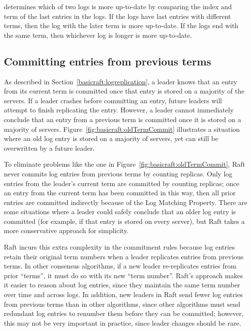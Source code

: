 \name{} determines which of two logs is more up-to-date by comparing
the index and term of the last entries in the logs. If
the logs have last entries with different terms, then the log with
the later term is more up-to-date. If the logs end with the same term,
then whichever log is longer is more up-to-date.

\subsection{Committing entries from previous terms}
As described in Section~\ref{basicraft:logreplication}, a leader knows
that an entry from its current term is committed once that entry
is stored on a majority of the servers. If a leader crashes
before committing an entry, future leaders will attempt to finish
replicating the entry. However, a leader cannot
immediately conclude that an entry from a previous term is
committed once it is stored on a majority of servers.
Figure~\ref{fig:basicraft:oldTermCommit}
illustrates a situation where an old log entry is stored on a
majority of servers, yet can still be overwritten by a future leader.

To eliminate problems like the one in
Figure~\ref{fig:basicraft:oldTermCommit}, Raft never commits log entries
from previous terms by counting replicas. Only log entries
from the leader's current term are committed by counting replicas;
once an entry from the current term has been committed in this way,
then all prior entries are committed
indirectly because of the Log Matching Property. There are some
situations where a leader could safely conclude
that an older log entry is committed (for example, if that entry is stored
on every server), but Raft takes a more conservative approach
for simplicity.

Raft incurs this extra complexity in the commitment rules because
log entries retain their original term numbers when a leader
replicates entries from previous terms. In other consensus algorithms,
if a new leader re-replicates entries from prior ``terms'',
it must do so with its new ``term number''. Raft's
approach makes it easier to reason about log entries, since they
maintain the same term number over time and across logs. In
addition, new leaders in Raft
send fewer log entries from previous terms than in other algorithms,
since other algorithms must send redundant log entries to renumber them
before they can be committed; however, this may not be very
important in practice, since leader changes should be rare.

